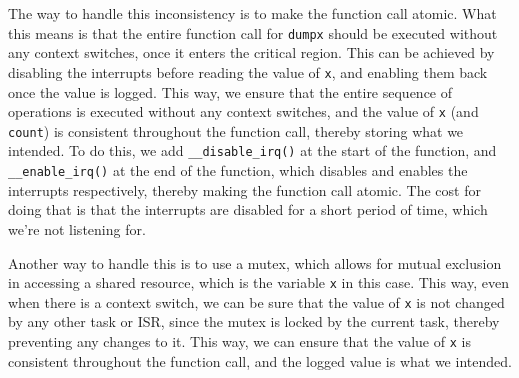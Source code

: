 \vspace*{1em}
The way to handle this inconsistency is to make the function call atomic.
What this means is that the entire function call for \texttt{dumpx} should be executed without any context switches, once it enters the critical region.
This can be achieved by disabling the interrupts before reading the value of \texttt{x}, and enabling them back once the value is logged.
This way, we ensure that the entire sequence of operations is executed without any context switches, and the value of \texttt{x} (and \texttt{count}) is consistent throughout the function call, thereby storing what we intended.
To do this, we add \texttt{\_\_disable\_irq()} at the start of the function, and \texttt{\_\_enable\_irq()} at the end of the function, which disables and enables the interrupts respectively, thereby making the function call atomic.
The cost for doing that is that the interrupts are disabled for a short period of time, which we're not listening for.

Another way to handle this is to use a mutex, which allows for mutual exclusion in accessing a shared resource, which is the variable \texttt{x} in this case.
This way, even when there is a context switch, we can be sure that the value of \texttt{x} is not changed by any other task or ISR, since the mutex is locked by the current task, thereby preventing any changes to it.
This way, we can ensure that the value of \texttt{x} is consistent throughout the function call, and the logged value is what we intended.
